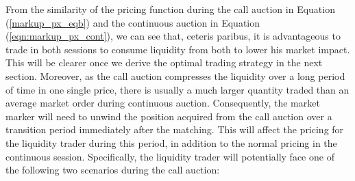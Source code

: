From the similarity of the pricing function during the call auction in Equation (\ref{markup_px_eqb}) and the continuous auction in Equation (\ref{eqn:markup_px_cont}), we can see that, ceteris paribus, it is advantageous to trade in both sessions to consume liquidity from both to lower his market impact. This will be clearer once we derive the optimal trading strategy in the next section. Moreover, as the call auction compresses the liquidity over a long period of time in one single price, there is usually a much larger quantity traded than an average market order during continuous auction. Consequently, the market marker will need to unwind the position acquired from the call auction over a transition period immediately after the matching. This will affect the pricing for the liquidity trader during this period, in addition to the normal pricing in the continuous session. Specifically, the liquidity trader will potentially face one of the following two scenarios during the call auction:

